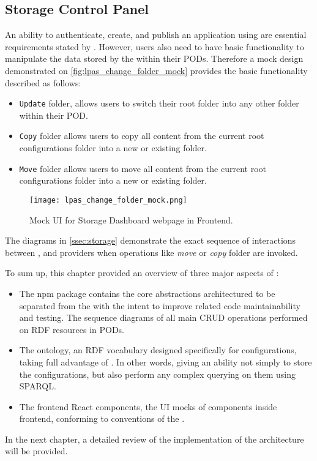 \subsection{Storage Control Panel}
\label{sssec:architecture_storage_control_panel}

An ability to authenticate, create, and publish an application using \solid{} are essential requirements stated by \lpa{}. However, users also need to have basic functionality to manipulate the data stored by the \lpas{} within their PODs. Therefore a mock design demonstrated on \autoref{fig:lpas_change_folder_mock} provides the basic functionality described as follows:

\begin{itemize}
    \item \texttt{Update} folder, allows users to switch their root folder into any other folder within their POD.
    \item \texttt{Copy} folder allows users to copy all content from the current root configurations folder into a new or existing folder.
    \item \texttt{Move} folder allows users to move all content from the current root configurations folder into a new or existing folder.
\end{itemize}


\begin{figure}[h]
\centering
\texttt{[image: lpas\_change\_folder\_mock.png]}
\caption{Mock UI for Storage Dashboard webpage in \lpa{} Frontend.}
\label{fig:lpas_change_folder_mock}
\end{figure}

The diagrams in \autoref{ssec:storage} demonstrate the exact sequence of interactions between \lpa{}, \lpas{} and \solid{} providers when operations like \textit{move} or \textit{copy} folder are invoked.

To sum up, this chapter provided an overview of three major aspects of \lpas:
\begin{itemize}
    \item The npm package contains the core abstractions architectured to be separated from the \lpa{} with the intent to improve \solid{} related code maintainability and testing. The sequence diagrams of all main CRUD operations performed on RDF resources in \solid{} PODs.
    \item The \lpas{} ontology, an RDF vocabulary designed specifically for \lpa{} configurations, taking full advantage of \solid{}. In other words, giving an ability not simply to store the \lpa{} configurations, but also perform any complex querying on them using SPARQL.
    \item The frontend React components, the UI mocks of components inside \lpa{} frontend, conforming to conventions of the \lpa{}.
\end{itemize}
In the next chapter, a detailed review of the implementation of the architecture will be provided.


